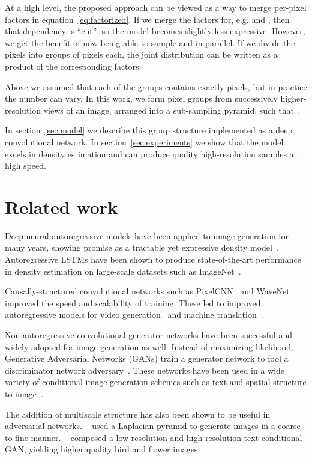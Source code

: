 \documentclass{article}
\begin{document}
At a high level, the proposed approach can be viewed as a way to merge per-pixel factors in equation~\ref{eq:factorized}.
If we merge the factors for, e.g.  and , then that dependency is ``cut'', so the model becomes slightly less expressive.
However, we get the benefit of now being able to sample  and  in parallel.
If we divide the  pixels into  groups of  pixels each, the joint distribution can be written as a product of the corresponding  factors:

Above we assumed that each of the  groups contains exactly  pixels, but in practice the number can vary.
In this work, we form pixel groups from successively higher-resolution views of an image, arranged into a sub-sampling pyramid, such that .

In section~\ref{sec:model} we describe this group structure implemented as a deep convolutional network.
In section~\ref{sec:experiments} we show that the model excels in density estimation and can produce quality high-resolution samples at high speed.
\section{Related work}
\label{sec:related}
Deep neural autoregressive models have been applied to image generation for many years, showing promise as a tractable yet expressive density model~\citep{larochelle2011neural,uria2013rnade}.
Autoregressive LSTMs have been shown to produce state-of-the-art performance in density estimation on large-scale  datasets such as ImageNet~\cite{Theis2015c,Oord2016pixelRNN}.


Causally-structured convolutional networks such as PixelCNN~\citep{oord2016conditional}
and WaveNet~\citep{oord2016wavenet} improved the speed and scalability of training.
These led to improved autoregressive models for video generation~\citep{kalchbrenner2016video} and machine translation~\citep{kalchbrenner2016neural}.

Non-autoregressive convolutional generator networks have been successful and widely adopted for image generation as well.
Instead of maximizing likelihood, Generative Adversarial Networks (GANs) train a generator network to fool a discriminator network adversary~\cite{GoodfellowPMXWOCB14}.
These networks have been used in a wide variety of conditional image generation schemes such as text and spatial structure to image~\cite{mansimov2015generating,reed2016generative,reed2016learning,wang2016generative}.


The addition of multiscale structure has also been shown to be useful in adversarial networks.
~\citet{denton2015deep} used a Laplacian pyramid to generate images in a coarse-to-fine manner.
~\citet{zhang2016stackgan} composed a low-resolution and high-resolution text-conditional GAN, yielding higher quality  bird and flower images. 
\end{document}
